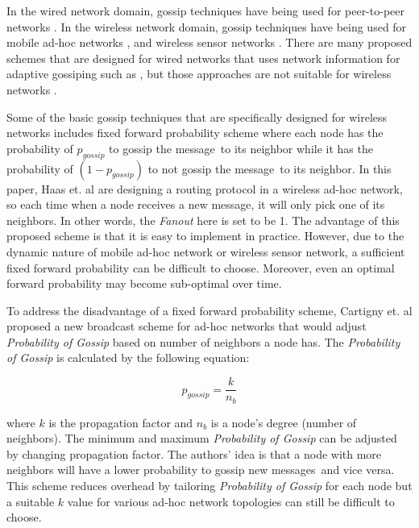 \documentclass[onehalf,11pt]{beavtex}
\newcommand{\pog}{Probability of Gossip}
\newcommand{\msgs}{messages}
\newcommand{\msg}{message}
\begin{document}
In the wired network domain, gossip techniques have being used for peer-to-peer networks \cite{gupta2002efficient}. In the wireless network domain, gossip techniques have being used for mobile ad-hoc networks \cite{chandra2001anonymous}\cite{vahdat2000epidemic}, and wireless sensor networks \cite{levis2004trickle}\cite{miller2005exploring}. There are many proposed schemes that are designed for wired networks that uses network information for adaptive gossiping such as \cite{kempe2004spatial}\cite{rodrigues2003adaptive}, but those approaches are not suitable for wireless networks \cite{smart}. 

Some of the basic gossip techniques that are specifically designed for wireless networks includes fixed forward probability scheme \cite{haas2006gossip} where each node has the probability of $p_{gossip}$ to gossip the \msg ~to its neighbor while it has the probability of $(1-p_{gossip})$ to not gossip the \msg ~to its neighbor. In this paper, Haas et. al \cite{haas2006gossip} are designing a routing protocol in a wireless ad-hoc network, so each time when a node receives a new \msg, it will only pick one of its neighbors. In other words, the \emph{Fanout} here is set to be 1. The advantage of this proposed scheme is that it is easy to implement in practice. However, due to the dynamic nature of mobile ad-hoc network or wireless sensor network, a sufficient fixed forward probability can be difficult to choose. Moreover, even an optimal forward probability may become sub-optimal over time. 

To address the disadvantage of a fixed forward probability scheme, Cartigny et. al \cite{cartigny2003border} proposed a new broadcast scheme for ad-hoc networks that would adjust \emph{\pog} based on number of neighbors a node has. The \emph{\pog} is calculated by the following equation:

\[p_{gossip}=\frac{k}{n_b} \]

where $k$ is the propagation factor and $n_b$ is a node's degree (number of neighbors). The minimum and maximum \emph{\pog} can be adjusted by changing propagation factor. The authors' idea is that a node with more neighbors will have a lower probability to gossip new \msgs ~and vice versa. This scheme reduces overhead by tailoring \emph{\pog} for each node but a suitable $k$ value for various ad-hoc network topologies can still be difficult to choose. 
\end{document}
